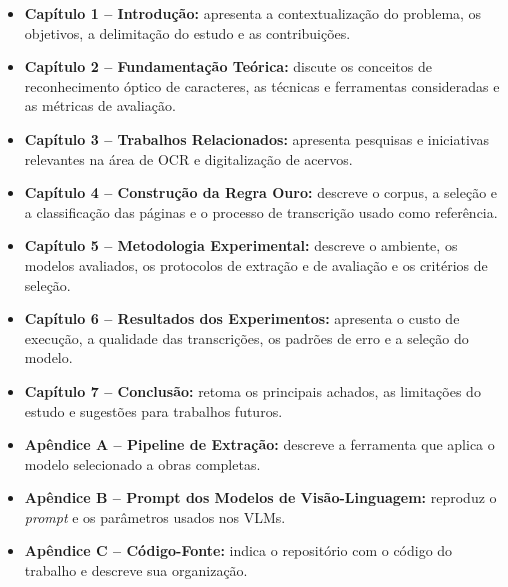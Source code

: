 \documentclass[noabntexcite,oneside]{ufsc-thesis-rn46-2019}
\begin{document}
\begin{itemize}
    \item \textbf{Capítulo 1 -- Introdução:} apresenta a contextualização do problema,
    os objetivos, a delimitação do estudo e as contribuições.

    \item \textbf{Capítulo 2 -- Fundamentação Teórica:} discute os conceitos de
    reconhecimento óptico de caracteres, as técnicas e ferramentas consideradas e as
    métricas de avaliação.

    \item \textbf{Capítulo 3 -- Trabalhos Relacionados:} apresenta pesquisas e
    iniciativas relevantes na área de OCR e digitalização de acervos.

    \item \textbf{Capítulo 4 -- Construção da Regra Ouro:} descreve o corpus, a seleção e
    a classificação das páginas e o processo de transcrição usado como referência.

    \item \textbf{Capítulo 5 -- Metodologia Experimental:} descreve o ambiente, os modelos
    avaliados, os protocolos de extração e de avaliação e os critérios de seleção.

    \item \textbf{Capítulo 6 -- Resultados dos Experimentos:} apresenta o custo de
    execução, a qualidade das transcrições, os padrões de erro e a seleção do modelo.

    \item \textbf{Capítulo 7 -- Conclusão:} retoma os principais achados, as limitações
    do estudo e sugestões para trabalhos futuros.

    \item \textbf{Apêndice A -- Pipeline de Extração:} descreve a ferramenta que aplica o
    modelo selecionado a obras completas.

    \item \textbf{Apêndice B -- Prompt dos Modelos de Visão-Linguagem:} reproduz o
    \textit{prompt} e os parâmetros usados nos VLMs.

    \item \textbf{Apêndice C -- Código-Fonte:} indica o repositório com o código do
    trabalho e descreve sua organização.
\end{itemize}

\end{document}
